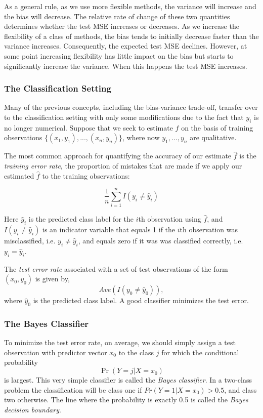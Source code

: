 \documentclass{article}
\numberwithin{equation}{section}
\begin{document}
As a general rule, as we use more flexible methods, the variance will increase and the bias will decrease. The relative rate of change of these two quantities determines whether the test MSE increases or decreases. As we increase the flexibility of a class of methods, the bias tends to initially decrease faster than the variance increases. Consequently, the expected test MSE declines. However, at some point increasing flexibility has little impact on the bias but starts to significantly increase the variance. When this happens the test MSE increases. 


\subsubsection{The Classification Setting}
Many of the previous concepts, including the bias-variance trade-off, transfer over to the classification setting with only some modifications due to the fact that $y_i$ is no longer numerical. Suppose that we seek to estimate $f$ on the basis of training observations $\{(x_1, y_1),...,(x_n, y_n)\}$, where now $y_1,...,y_n$ are qualitative.

The most common approach for quantifying the accuracy of our estimate $\hat f$ is the \textit{training error rate}, the proportion of mistakes that are made if we apply our estimated $\hat f$ to the training observations:

\begin{equation}
    \frac{1}{n} \sum_{i=1}^n I(y_i  \neq \hat y_i)
\end{equation}

Here $\hat y_i$ is the predicted class label for the $i$th observation using $\hat f$, and $I(y_i \neq \hat y_i)$ is an indicator variable that equals 1 if the $i$th observation was misclassified, i.e. $y_i \neq \hat y_i$, and equals zero if it was was classified correctly, i.e. $y_i = \hat y_i$.


The \textit{test error rate} associated with a set of test observations of the form $(x_0, y_0)$ is given by,
\begin{equation}
    Ave(I(y_0 \neq \hat y_0)),
\end{equation}
where $\hat y_0$ is the predicted class label. A good classifier minimizes the test error.

\subsubsection{The Bayes Classifier}
To minimize the test error rate, on average, we should simply assign a test observation with predictor vector $x_0$ to the class $j$ for which the conditional probability
\begin{equation}
    \Pr(Y = j|X = x_0)
\end{equation}
is largest. This very simple classifier is called the \textit{Bayes classifier}. In a two-class problem the classification will be class one if $Pr(Y = 1|X = x_0) > 0.5$, and class two otherwise. The line where the probability is exactly 0.5 is called the \textit{Bayes decision boundary}.
\end{document}
